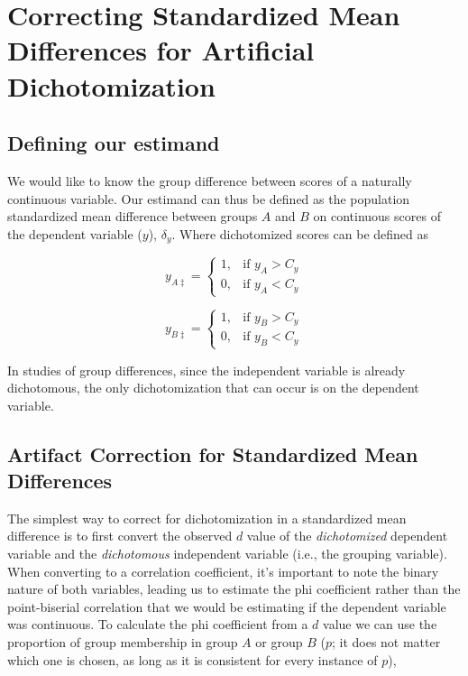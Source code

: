 \documentclass[
  letterpaper,
  DIV=11,
  numbers=noendperiod]{scrreprt}
\begin{document}
\hypertarget{correcting-standardized-mean-differences-for-artificial-dichotomization}{%
\section{Correcting Standardized Mean Differences for Artificial
Dichotomization}\label{correcting-standardized-mean-differences-for-artificial-dichotomization}}

\hypertarget{defining-our-estimand-4}{%
\subsection{Defining our estimand}\label{defining-our-estimand-4}}

We would like to know the group difference between scores of a naturally
continuous variable. Our estimand can thus be defined as the population
standardized mean difference between groups \(A\) and \(B\) on
continuous scores of the dependent variable (\(y\)), \(\delta_{y}\).
Where dichotomized scores can be defined as

\[
 y_{A\ddagger}= 
\begin{cases}
    1,& \text{if } y_A>C_y\\
    0,& \text{if } y_A<C_y
\end{cases}
\]

\[
 y_{B\ddagger}= 
\begin{cases}
    1,& \text{if } y_B>C_y\\
    0,& \text{if } y_B<C_y
\end{cases}
\]

In studies of group differences, since the independent variable is
already dichotomous, the only dichotomization that can occur is on the
dependent variable.

\hypertarget{sec-corr-smd}{%
\subsection{Artifact Correction for Standardized Mean
Differences}\label{sec-corr-smd}}

The simplest way to correct for dichotomization in a standardized mean
difference is to first convert the observed \(d\) value of the
\emph{dichotomized} dependent variable and the \emph{dichotomous}
independent variable (i.e., the grouping variable). When converting to a
correlation coefficient, it's important to note the binary nature of
both variables, leading us to estimate the phi coefficient rather than
the point-biserial correlation that we would be estimating if the
dependent variable was continuous. To calculate the phi coefficient from
a \(d\) value we can use the proportion of group membership in group
\(A\) or group \(B\) (\(p\); it does not matter which one is chosen, as
long as it is consistent for every instance of \(p\)),
\end{document}

